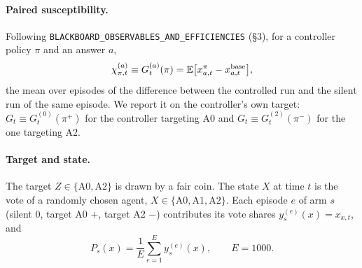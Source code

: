 \documentclass[10pt,a4paper]{article}
\begin{document}
\paragraph{Paired susceptibility.} Following \texttt{BLACKBOARD\_OBSERVABLES\_AND\_EFFICIENCIES} (\S3), for a
controller policy $\pi$ and an answer $a$,
\begin{equation}\label{eq:chi}
\chi^{(a)}_{\pi,t} \equiv G^{(a)}_t(\pi) = \mathbb E\bigl[x^{\pi}_{a,t} - x^{\rm base}_{a,t}\bigr],
\end{equation}
the mean over episodes of the difference between the controlled run and the silent run of the same episode. We
report it on the controller's own target: $G_t \equiv G^{(0)}_t(\pi^{+})$ for the controller targeting A0 and
$G_t \equiv G^{(2)}_t(\pi^{-})$ for the one targeting A2.

\paragraph{Target and state.} The target $Z \in \{\text{A0}, \text{A2}\}$ is drawn by a fair coin. The state $X$
at time $t$ is the vote of a randomly chosen agent, $X \in \{\text{A0},\text{A1},\text{A2}\}$. Each episode $e$ of arm $s$
(silent 0, target A0 $+$, target A2 $-$) contributes its vote shares $y^{(e)}_s(x) = x_{x,t}$, and
\begin{equation}\label{eq:P}
P_s(x) = \frac1E\sum_{e=1}^{E} y^{(e)}_s(x), \qquad E = 1000 .
\end{equation}
\end{document}

